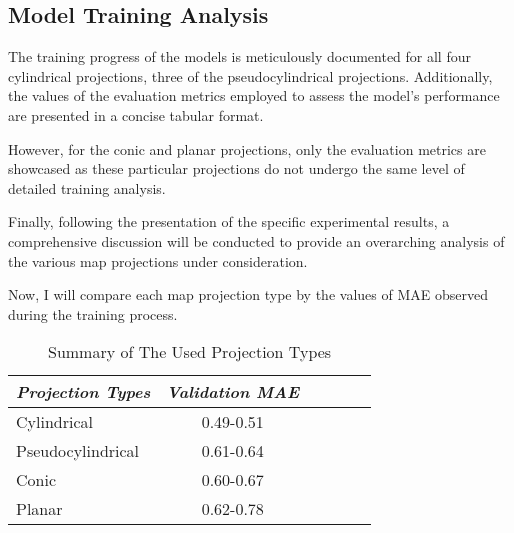 \subsection{Model Training Analysis}
The training progress of the models is meticulously documented for all four cylindrical projections, three of the pseudocylindrical projections.
Additionally, the values of the evaluation metrics employed to assess the model's performance are presented in a concise tabular format.

However, for the conic and planar projections, only the evaluation metrics are showcased as these particular projections do not undergo the same level of detailed training
analysis.

Finally, following the presentation of the specific experimental results, a comprehensive discussion will be conducted to provide an overarching analysis of the
various map projections under consideration.

\clearpage

\clearpage

\clearpage


\clearpage



Now, I will compare each map projection type by the values of MAE observed during the training process.

\begin{table}[ht]
    \centering
    \caption{Summary of The Used Projection Types}
    \label{cylindrical_results_table}
    \renewcommand{\arraystretch}{1.2} %
    \begin{tabular}{|l|c|c|c|c|c|}
        \hline
        \rowcolor[gray]{0.9}
        \textbf{\emph{Projection Types}} & \textbf{\emph{Validation MAE}} \\ \hline
        Cylindrical                      & 0.49-0.51                      \\ \hline
        Pseudocylindrical                & 0.61-0.64                      \\ \hline
        Conic                            & 0.60-0.67                      \\ \hline
        Planar                           & 0.62-0.78                      \\ \hline
    \end{tabular}
\end{table}


